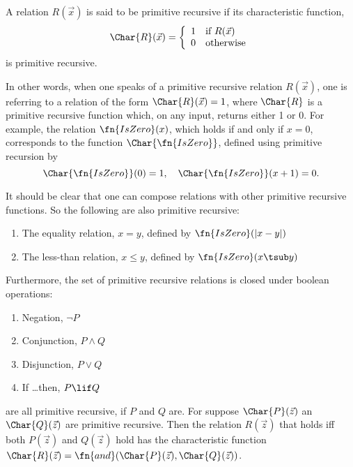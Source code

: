 \documentclass[../../../include/open-logic-section]{subfiles}
\begin{document}


\begin{defn}
A relation $R(\vec x)$ is said to be primitive recursive if its characteristic
function,
\[
\Char{R}(\vec x) = \left\{
  \begin{array}{ll}
  1 & \mbox{if $R(\vec x)$} \\
  0 & \mbox{otherwise}
  \end{array}
\right.
\]
is primitive recursive.
\end{defn}

In other words, when one speaks of a primitive recursive relation
$R(\vec x)$, one is referring to a relation of the form $\Char{R}(\vec
x) = 1$, where $\Char{R}$ is a primitive recursive function which, on
any input, returns either 1 or 0. For example, the relation
$\fn{IsZero}(x)$, which holds if and only if $x = 0$, corresponds to the
function $\Char{\fn{IsZero}}$, defined using primitive recursion by
\[
\Char{\fn{IsZero}}(0) = 1, \quad \Char{\fn{IsZero}}(x+1) = 0.
\]

It should be clear that one can compose relations with other primitive
recursive functions. So the following are also primitive recursive:
\begin{enumerate}
\item The equality relation, $x = y$, defined by $\fn{IsZero}(\left|x -
  y\right|)$
\item The less-than relation, $x \leq y$, defined by $\fn{IsZero}(x
  \tsub y)$
\end{enumerate}
Furthermore, the set of primitive recursive relations is closed under
boolean operations:
\begin{enumerate}
\item Negation, $\lnot P$
\item Conjunction, $P \land Q$
\item Disjunction, $P \lor Q$
\item If \dots then, $P \lif Q$
\end{enumerate}
are all primitive recursive, if $P$ and $Q$ are. For suppose
$\Char{P}(\vec z)$ an $\Char{Q}(\vec z)$ are primitive recursive. Then
the relation $R(\vec z)$ that holds iff both $P(\vec z)$ and $Q(\vec
z)$ hold has the characteristic function $\Char{R}(\vec z) =
\fn{and}(\Char{P}(\vec z), \Char{Q}(\vec z))$.
\end{document}
